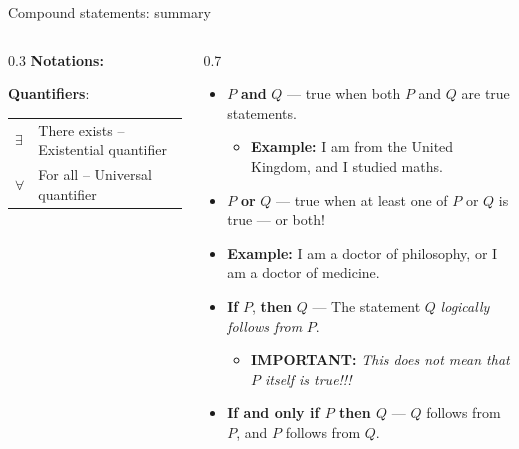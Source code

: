 \documentclass[11pt,aspectratio=1610]{beamer}
\begin{document}
	
	\begin{frame}{Compound statements: summary}
		\begin{columns}[t]			
			\begin{column}{0.3\textwidth}
			\textbf{Notations:}
			\vspace{2mm}
			
	\p
	\textbf{Quantifiers}:\\
	\vspace{2mm}
	\begin{tabular}{l|l}
	$\exists$	&  There exists -- Existential quantifier\\
		$\forall$	& For all  -- Universal quantifier\\
	\end{tabular}			
			\end{column}
	\p			
		\begin{column}{0.7\textwidth}
			\vspace{-5mm}
			\begin{itemize}\itemsep2mm
				\item $P$ \textbf{and} $Q$ --- true when both $P$ and $Q$ are true statements. 
				\begin{itemize}
					\item \textbf{Example:} I am from the United Kingdom, and I studied maths. 
				\end{itemize}
				\item $P$ \textbf{or} $Q$ --- true when at least one of $P$ or $Q$ is true --- or both!
				\item \textbf{Example:} I am a doctor of philosophy, or I am a doctor of medicine. 
				\item \textbf{If} $P$, \textbf{then} $Q$ --- The statement $Q$ \emph{logically follows from} $P$. 
				\begin{itemize}
					\item \textbf{IMPORTANT:} \textit{This does not mean that $P$ itself is true!!!} 					
				\end{itemize}
				\item \textbf{If and only if $P$ then $Q$} --- $Q$ follows from $P$, and $P$ follows from $Q$.				
			\end{itemize}
		\end{column}	
	

\end{columns}
\end{frame}
\end{document}
